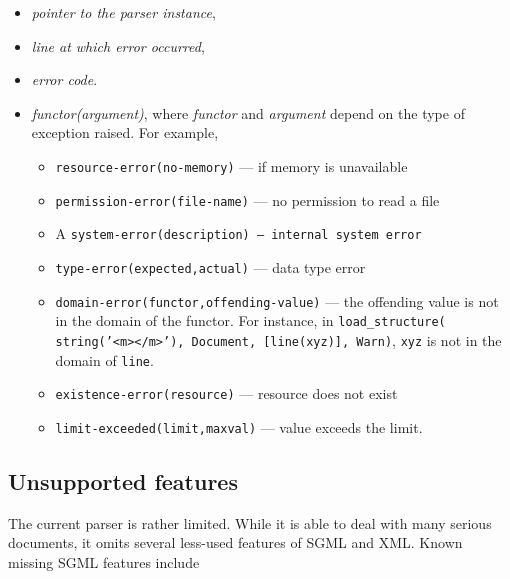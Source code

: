 \begin{itemize}
\item {\it pointer to the parser instance}, 
\item {\it line at which error occurred},
\item {\it error code}. 
\item	{\it functor(argument)}, where \emph{functor} and \emph{argument} 
  depend on the type of exception raised. For example, 
  \begin{itemize}
  \item[ ] {\tt resource-error(no-memory)}  --- if memory is unavailable
  \item[ ] {\tt permission-error(file-name)}  --- no permission to read a file
  \item[ ] A {\tt system-error(description) --- internal system error} 

  \item[ ] {\tt type-error(expected,actual)} --- data type error
  \item[ ] {\tt domain-error(functor,offending-value)}  --- the offending
    value is not in the domain of the functor. For instance, 
    in {\tt load\_structure( string('<m></m>'), Document, [line(xyz)], Warn)},
    {\tt xyz} is not in the domain of {\tt line}.  

  \item[ ] {\tt existence-error(resource)} --- resource does not exist
  \item[ ] {\tt limit-exceeded(limit,maxval)} --- value exceeds the limit.
  \end{itemize}
\end{itemize}

\subsection{Unsupported features}

The current parser is rather limited. While it is able to deal with many
serious documents, it omits several less-used features of SGML and XML.
Known missing SGML features include


